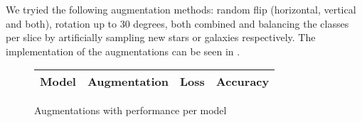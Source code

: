We tryied the following augmentation methods: random flip (horizontal, vertical and both), rotation up to 30 degrees, both combined and balancing the classes per slice by artificially sampling new stars or galaxies respectively.
The implementation of the augmentations can be seen in .
\begin{figure}
    \begin{tabularx}{\linewidth}{mmmm}
        \hline
        Model & Augmentation & Loss & Accuracy \\
        \hline
    \end{tabularx}
    \caption{Augmentations with performance per model}
    \label{AugPerformance}
\end{figure}
